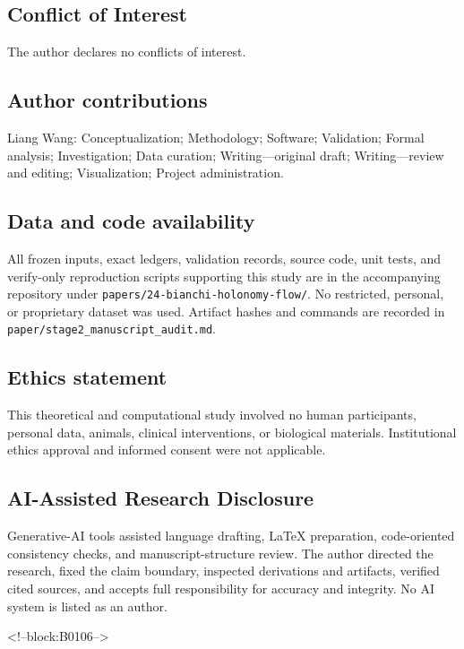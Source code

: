 \documentclass[11pt,a4paper]{article}
\theoremstyle{definition}
\theoremstyle{remark}
\begin{document}
\subsection*{Conflict of Interest}
The author declares no conflicts of interest.
\subsection*{Author contributions}
Liang Wang: Conceptualization; Methodology; Software; Validation; Formal analysis; Investigation; Data curation; Writing---original draft; Writing---review and editing; Visualization; Project administration.
\subsection*{Data and code availability}
All frozen inputs, exact ledgers, validation records, source code, unit tests, and verify-only reproduction scripts supporting this study are in the accompanying repository under \texttt{papers/24-bianchi-holonomy-flow/}. No restricted, personal, or proprietary dataset was used. Artifact hashes and commands are recorded in \texttt{paper/stage2\_manuscript\_audit.md}.
\subsection*{Ethics statement}
This theoretical and computational study involved no human participants, personal data, animals, clinical interventions, or biological materials. Institutional ethics approval and informed consent were not applicable.
\subsection*{AI-Assisted Research Disclosure}
Generative-AI tools assisted language drafting, LaTeX preparation, code-oriented consistency checks, and manuscript-structure review. The author directed the research, fixed the claim boundary, inspected derivations and artifacts, verified cited sources, and accepts full responsibility for accuracy and integrity. No AI system is listed as an author.

<!--block:B0106-->


\end{document}
